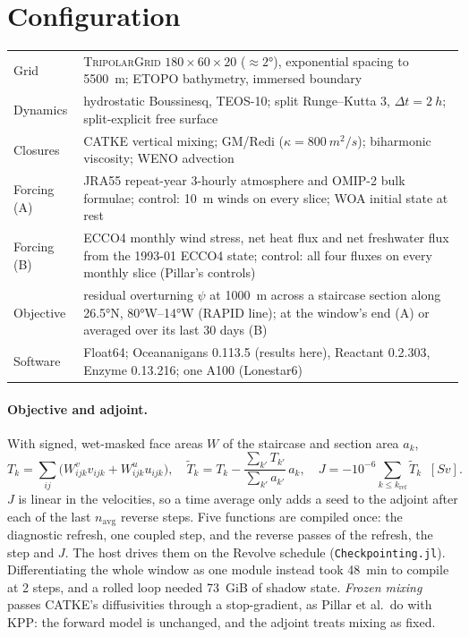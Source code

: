\documentclass[10pt]{article}
\begin{document}
\section*{Configuration}

\begin{center}\small
\begin{tabular}{@{}lp{}@{}}
\toprule
Grid & \textsc{TripolarGrid} $180\times60\times20$ ($\approx\ang{2}$), exponential spacing to \SI{5500}{m};
       ETOPO bathymetry, immersed boundary \\
Dynamics & hydrostatic Boussinesq, TEOS-10; split Runge--Kutta 3, $\Delta t = \SI{2}{h}$; split-explicit free surface \\
Closures & CATKE vertical mixing; GM/Redi ($\kappa = \SI{800}{m^2/s}$); biharmonic viscosity; WENO advection \\
Forcing (A) & JRA55 repeat-year 3-hourly atmosphere and OMIP-2 bulk formulae; control: \SI{10}{m} winds on every
              slice; WOA initial state at rest \\
Forcing (B) & ECCO4 monthly wind stress, net heat flux and net freshwater flux from the 1993-01 ECCO4 state;
              control: all four fluxes on every monthly slice (Pillar's controls) \\
Objective & residual overturning $\psi$ at \SI{1000}{m} across a staircase section along \ang{26.5}N, \ang{80}W--\ang{14}W
            (RAPID line); at the window's end (A) or averaged over its last 30 days (B) \\
Software & Float64; Oceananigans 0.113.5 (results here), Reactant 0.2.303, Enzyme 0.13.216; one A100 (Lonestar6) \\
\bottomrule
\end{tabular}
\end{center}

\paragraph{Objective and adjoint.} With signed, wet-masked face areas $W$ of the staircase and section area $a_k$,
\begin{equation*}
T_k = \sum_{ij} \big(W^{v}_{ijk} v_{ijk} + W^{u}_{ijk} u_{ijk}\big), \quad
\tilde T_k = T_k - \frac{\sum_{k'} T_{k'}}{\sum_{k'} a_{k'}}\, a_k, \quad
J = -10^{-6} \sum_{k \le k_{\text{ref}}} \tilde T_k \;\;[\si{Sv}].
\end{equation*}
$J$ is linear in the velocities, so a time average only adds a seed to the adjoint after each of the last
$n_{\text{avg}}$ reverse steps. Five functions are compiled once: the diagnostic refresh, one coupled step,
and the reverse passes of the refresh, the step and $J$. The host drives them on the Revolve schedule
(\texttt{Checkpointing.jl}). Differentiating the whole window as one module instead took \SI{48}{min} to
compile at 2 steps, and a rolled loop needed \SI{73}{GiB} of shadow state. \emph{Frozen mixing} passes
CATKE's diffusivities through a stop-gradient, as Pillar et al.\ do with KPP: the forward model is
unchanged, and the adjoint treats mixing as fixed.
\end{document}
